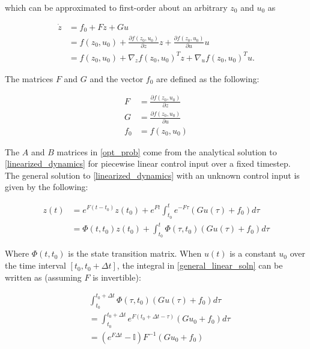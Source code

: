 \documentclass{exam}
\begin{document}
\begin{multicols*}{2}
which can be approximated to first-order about an arbitrary $z_0$ and $u_0$ as

\begin{equation}
    \label{linearized_dynamics}
    \begin{aligned}
        \dot{z} &= f_0 + F z + G u \\
        &= f(z_0, u_0) + \frac{\partial f(z_0, u_0)}{\partial z} z + \frac{\partial f(z_0, u_0)}{\partial u} u \\
        &= f(z_0, u_0) + \nabla_z f(z_0, u_0)^T z + \nabla_u f(z_0, u_0)^T u .
    \end{aligned}
\end{equation}

The matrices $F$ and $G$ and the vector $f_0$ are defined as the following:

\begin{equation}
    \label{eq:lin-dyn-labeled-derivs-whatevs}
    \begin{aligned}
        F &= \frac{\partial f(z_0, u_0)}{\partial z} \\
        G &= \frac{\partial f(z_0, u_0)}{\partial u} \\
        f_0 &= f(z_0, u_0)
    \end{aligned}
\end{equation}

The $A$ and $B$ matrices in \eqref{opt_prob} come from the analytical solution to \eqref{linearized_dynamics} for piecewise linear control input over a fixed timestep. The general solution to \eqref{linearized_dynamics} with an unknown control input is given by the following:

\begin{equation}
    \label{general_linear_soln}
    \begin{aligned}
        z(t) &= e^{F(t - t_0)}z(t_0) + e^{Ft}\int_{t_0}^t e^{-F\tau} (G u(\tau) + f_0) d\tau \\
        &= \Phi(t, t_0)z(t_0) + \int_{t_0}^t \Phi(\tau, t_0) (G u(\tau) + f_0) d\tau
    \end{aligned}
\end{equation}

Where $\Phi(t, t_0)$ is the state transition matrix. When $u(t)$ is a constant $u_0$ over the time interval $[t_0, t_0 + \Delta t]$, the integral in \eqref{general_linear_soln} can be written as (assuming $F$ is invertible):

\begin{equation}
    \label{constant_input_integ_soln}
    \begin{split}
    &\int_{t_0}^{t_0 + \Delta t} \Phi(\tau, t_0) (G u(\tau) + f_0) d\tau\\
    &= \int_{t_0}^{t_0 + \Delta t} e^{F(t_0 + \Delta t -\tau)} (G u_0 + f_0) d\tau \\
    &= (e^{F \Delta t} - \mathbb{I})F^{-1}(G u_0 + f_0)
    \end{split}
\end{equation}


\end{multicols*}
\end{document}
